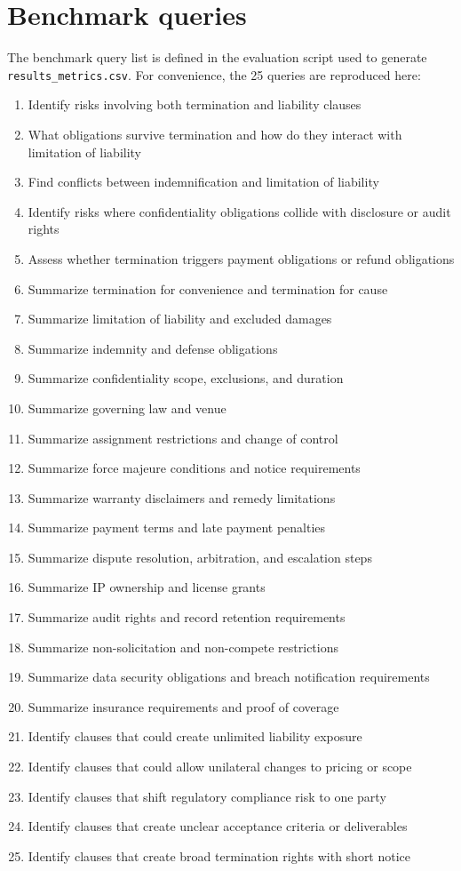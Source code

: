 \documentclass[11pt]{article}
\begin{document}
\section{Benchmark queries}\label{app:queries}
The benchmark query list is defined in the evaluation script used to generate \texttt{results\_metrics.csv}. For convenience, the 25 queries are reproduced here:
\begin{enumerate}[leftmargin=*]
  \item Identify risks involving both termination and liability clauses
  \item What obligations survive termination and how do they interact with limitation of liability
  \item Find conflicts between indemnification and limitation of liability
  \item Identify risks where confidentiality obligations collide with disclosure or audit rights
  \item Assess whether termination triggers payment obligations or refund obligations
  \item Summarize termination for convenience and termination for cause
  \item Summarize limitation of liability and excluded damages
  \item Summarize indemnity and defense obligations
  \item Summarize confidentiality scope, exclusions, and duration
  \item Summarize governing law and venue
  \item Summarize assignment restrictions and change of control
  \item Summarize force majeure conditions and notice requirements
  \item Summarize warranty disclaimers and remedy limitations
  \item Summarize payment terms and late payment penalties
  \item Summarize dispute resolution, arbitration, and escalation steps
  \item Summarize IP ownership and license grants
  \item Summarize audit rights and record retention requirements
  \item Summarize non-solicitation and non-compete restrictions
  \item Summarize data security obligations and breach notification requirements
  \item Summarize insurance requirements and proof of coverage
  \item Identify clauses that could create unlimited liability exposure
  \item Identify clauses that could allow unilateral changes to pricing or scope
  \item Identify clauses that shift regulatory compliance risk to one party
  \item Identify clauses that create unclear acceptance criteria or deliverables
  \item Identify clauses that create broad termination rights with short notice
\end{enumerate}



\end{document}
